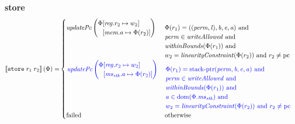 \documentclass[a4paper]{article}
\begin{document}
\noindent\textbf{store}\\
\begin{align*}
  \sem{\tstore{r_1}{r_2}}(\Phi) = &
                                    \begin{cases}
                                      \updPcAddr{}\left(
                                        \arraycolsep=0pt
                                        \begin{array}{rl}
                                          \Phi&\updReg{r_2}{w_2}\\
                                              &\update{\mem.a}{\Phi(r_2)}
                                        \end{array}
\right) & 
                                      \arraycolsep=0pt
                                      \begin{array}[t]{l}
                                        \Phi(r_1) = ((\perm,\lin),\baddr,\eaddr,\aaddr) \tand \\
                                        \perm \in \writeAllowed{} \tand\\
                                        \withinBounds{\Phi(r_1)} \tand \\
                                        w_2 = \linCons{\Phi(r_2)} \tand r_2 \neq \pcreg
                                      \end{array}
                                      \\
                                      \sourcecolor\left.
                                      \updPcAddr{}\left(
                                      \arraycolsep=0pt
                                      \begin{array}{rl}
                                        \Phi&\updReg{r_2}{w_2}\\
                                            &\update{\ms_\stk.a}{\Phi(r_2)}
                                      \end{array}
                                      \right) \right.& 
                                      \sourcecolor\left.
                                      \arraycolsep=0pt
                                      \begin{array}[t]{l}
                                        \Phi(r_1) = \stkptr{\perm,\baddr,\eaddr,\aaddr} \tand \\
                                        \perm \in \writeAllowed{} \tand \\
                                        \withinBounds{\Phi(r_1)} \tand \\
                                        \aaddr \in \dom(\Phi.\ms_\stk) \tand \\ %
                                        w_2 = \linCons{\Phi(r_2)} \tand r_2 \neq \pcreg
                                      \end{array}\right.\\
                                      \failed & \totherwise
                                    \end{cases}
\end{align*}
\end{document}
